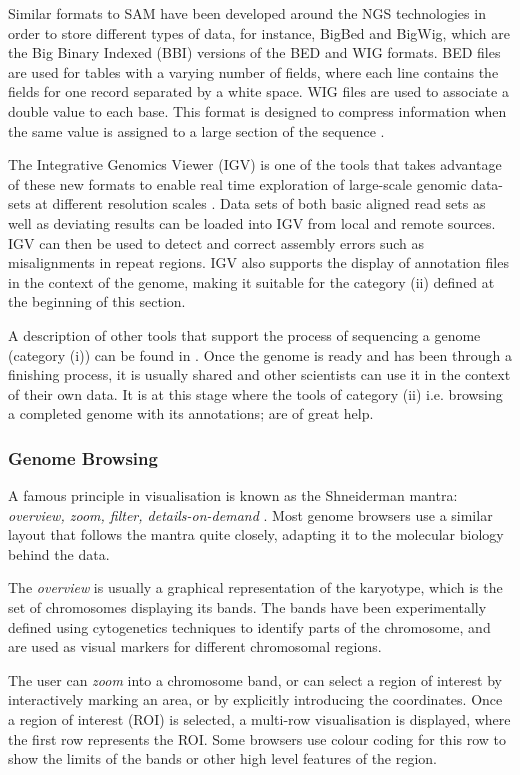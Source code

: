 Similar formats to SAM have been developed around the NGS technologies in order to store different types of data, for instance, BigBed and BigWig, which are the Big Binary Indexed (BBI) versions of the BED and WIG formats. BED files are used for tables with a varying number of fields, where each line contains the fields for one record separated by a white space. WIG files are used to associate a double value to each base. This format is designed to compress information when the same value is assigned to a large section of the sequence \cite{KEN2010}.

The Integrative Genomics Viewer (IGV) is one of the tools that takes advantage of these new formats to enable real time exploration of large-scale genomic data-sets at different resolution scales \cite{ROB2011}. Data sets of both basic aligned read sets as well as deviating results can be loaded into IGV from local and remote sources. IGV can then be used to detect and correct assembly errors such as misalignments in repeat regions. IGV also supports the display of annotation files in the context of the genome, making it suitable for the category (ii) defined at the beginning of this section.

A description of other tools that support the process of sequencing a genome (category (i)) can be found in \cite{NIE2010}. Once the genome is ready and has been through a finishing process, it is usually shared and other scientists can use it in the context of their own data. It is at this stage where the tools of category (ii) i.e. browsing a completed genome with its annotations; are of great help.

\subsubsection{Genome Browsing} \label{genome_browsing}
A famous principle in visualisation is known as the Shneiderman mantra: \emph{overview, zoom, filter, details-on-demand} \cite{SHN1996}. Most genome browsers use a similar layout that follows the mantra quite closely, adapting it to the molecular biology behind the data.

The \emph{overview} is usually a graphical representation of the karyotype, which is the set of chromosomes displaying its bands. The bands have been experimentally defined using cytogenetics techniques to identify parts of the chromosome, and are used as visual markers for different chromosomal regions.

The user can \emph{zoom} into a chromosome band, or can select a region of interest by interactively marking an area, or by explicitly introducing the coordinates. Once a region of interest (ROI) is selected, a multi-row visualisation is displayed, where the first row represents the ROI. Some browsers use colour coding for this row to show the limits of the bands or other high level features of the region.


